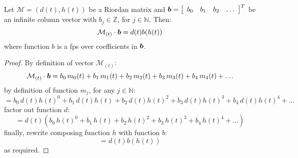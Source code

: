 \begin{theorem}
    Let $\mathcal{M}=(d(t),h(t))$ be a Riordan matrix and $\boldsymbol{b}=
    \left[\begin{array}{cccc}b_{0}&b_{1}&b_{2}&\ldots\end{array}\right]^{T}$ 
    be an infinite column vector with $b_{j}\in\mathbb{Z}$, for $j\in\mathbb{N}$. Then:
    \begin{displaymath}
        \mathcal{M}_{(t)}\cdot\boldsymbol{b}=d(t)b(h(t))
    \end{displaymath}
    where function $b$ is a \ac{fps} over coefficients in $\boldsymbol{b}$.
    \label{thm:riordan:group:fundamental:theorem}
\end{theorem}
\begin{proof}
    By definition of vector $\mathcal{M}_{(t)}$:
    \begin{displaymath}
        \mathcal{M}_{(t)}\cdot\boldsymbol{b}= b_{0}\,m_{0}(t) + b_{1}\,m_{1}(t) + b_{2}\,m_{2}(t) 
            + b_{3}\,m_{3}(t) + b_{4}\,m_{4}(t) + \ldots
    \end{displaymath}
    by definition of function $m_{j}$, for any $j\in\mathbb{N}$:
    \begin{displaymath}
        = b_{0}\,d(t)h(t)^{0} + b_{1}\,d(t)h(t) + b_{2}\,d(t)h(t)^{2} 
            + b_{3}\,d(t)h(t)^{3} + b_{4}\,d(t)h(t)^{4} + \ldots
    \end{displaymath}
    factor out function $d$:
    \begin{displaymath}
        = d(t)\left(b_{0}\,h(t)^{0} + b_{1}\,h(t) + b_{2}\,h(t)^{2} 
            + b_{3}\,h(t)^{3} + b_{4}\,h(t)^{4} + \ldots\right)
    \end{displaymath}
    finally, rewrite composing function $h$ with function $b$:
    \begin{displaymath}
        = d(t)b(h(t))  
    \end{displaymath}
    as required.

\end{proof}


